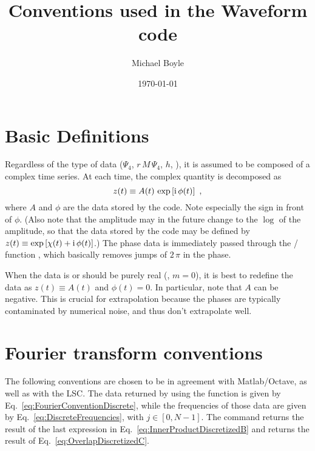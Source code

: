 \documentclass[aps, prd, amsfonts, amssymb, amsmath, %
nofootinbib]{revtex4}
\begin{document}


\graphicspath{{Plots/}}

\title{Conventions used in the Waveform code}

\author{Michael Boyle} \Cornell %

\date{\today}

\maketitle

\section{Basic Definitions}
\label{Sec:BasicDefinitions}

Regardless of the type of data ($\Psi_{4}$, $r\,M\,\Psi_{4}$, $h$,
\etc), it is assumed to be composed of a complex time series.  At each
time, the complex quantity is decomposed as
\begin{equation}
  z(t) \equiv A(t)\, \exp \left[ \mathrm{i}\, \phi(t) \right]\ ,
\end{equation}
where $A$ and $\phi$ are the data stored by the code.  Note especially
the sign in front of $\phi$.  (Also note that the amplitude may in the
future change to the $\log$ of the amplitude, so that the data stored
by the code may be defined by $z(t) \equiv \exp \left[ \chi(t) +
  \mathrm{i}\,\phi(t) \right]$.)  The phase data is immediately passed through
the / function ,
which basically removes jumps of $2\,\pi$ in the phase.

When the data is or should be purely real (\eg, $m=0$), it is best to
redefine the data as $z(t) \equiv A(t)$ and $\phi(t)=0$.  In
particular, note that $A$ can be negative.  This is crucial for
extrapolation because the phases are typically contaminated by
numerical noise, and thus don't extrapolate well.


\section{Fourier transform conventions}
\label{sec:FourierTransformConventions}

The following conventions are chosen to be in agreement with
Matlab/Octave, as well as with the LSC.  The data returned by using
the function  is given by
Eq.~\eqref{eq:FourierConventionDiscrete}, while the frequencies of
those data are given by Eq.~\eqref{eq:DiscreteFrequencies}, with $j
\in [0, N-1]$.  The command  returns the result
of the last expression in Eq.~\eqref{eq:InnerProductDiscretizedB} and
 returns the result of
Eq.~\eqref{eq:OverlapDiscretizedC}.
\end{document}
